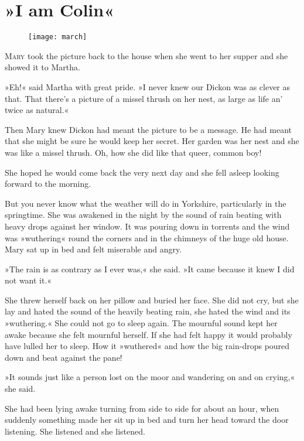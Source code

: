 \chapter{»I am Colin«} 
	
\begin{figure}[t!]
\centering
\texttt{[image: march]}
\end{figure}

	\lettrine[lines=6]{M}{ary} took the picture back to the house when she went to her supper and she showed it to Martha.

\zz
»Eh!« said Martha with great pride. »I never knew our Dickon was as clever as that. That there's a picture of a missel thrush on her nest, as large as life an' twice as natural.«

\zz
Then Mary knew Dickon had meant the picture to be a message. He had meant that she might be sure he would keep her secret. Her garden was her nest and she was like a missel thrush. Oh, how she did like that queer, common boy!

She hoped he would come back the very next day and she fell asleep looking forward to the morning.

But you never know what the weather will do in Yorkshire, particularly in the springtime. She was awakened in the night by the sound of rain beating with heavy drops against her window. It was pouring down in torrents and the wind was »wuthering« round the corners and in the chimneys of the huge old house. Mary sat up in bed and felt miserable and angry.

»The rain is as contrary as I ever was,« she said. »It came because it knew I did not want it.«

She threw herself back on her pillow and buried her face. She did not cry, but she lay and hated the sound of the heavily beating rain, she hated the wind and its »wuthering.« She could not go to sleep again. The mournful sound kept her awake because she felt mournful herself. If she had felt happy it would probably have lulled her to sleep. How it »wuthered« and how the big rain-drops poured down and beat against the pane!

»It sounds just like a person lost on the moor and wandering on and on crying,« she said.

She had been lying awake turning from side to side for about an hour, when suddenly something made her sit up in bed and turn her head toward the door listening. She listened and she listened.

